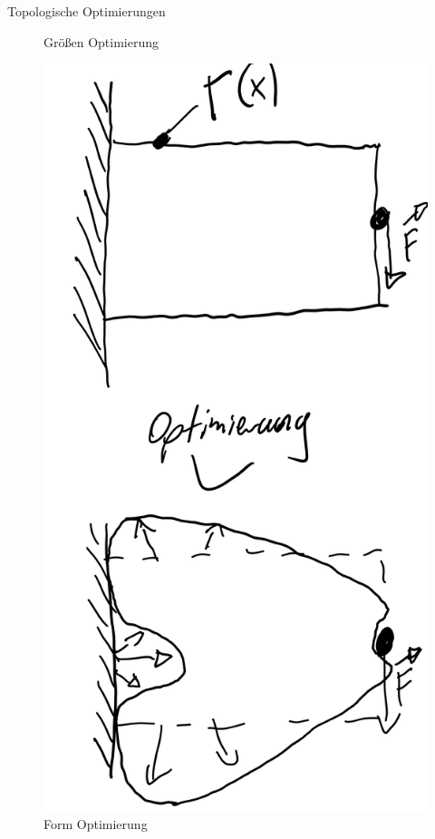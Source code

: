 \documentclass{beamer}
\begin{document}
\begin{frame}{Topologische Optimierungen}
\begin{figure}[htbp]
\begin{minipage}{0.2\textwidth}
            \caption{Gr\"o\ss{}en Optimierung}
        \end{minipage}\hfill
        \begin{minipage}{0.2\textwidth}
            \centering
            \includegraphics[width=\linewidth]{figures/Form-opt.png}
            \caption{Form Optimierung}

\end{minipage}
\end{figure}
\end{frame}
\end{document}
